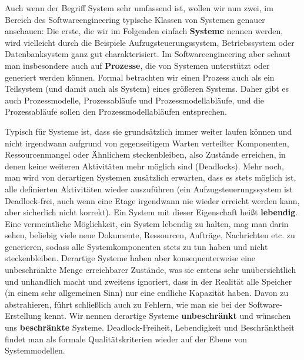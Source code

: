 \vspace{1mm} %

\label{text:prozesse_als_teilsysteme}
Auch wenn der Begriff System sehr umfassend ist, 
wollen wir nun zwei, im Bereich des Softwareengineering typische Klassen von Systemen genauer anschauen: Die erste, die wir im Folgenden einfach \textbf{Systeme} nennen werden, wird vielleicht durch die Beispiele Aufzugsteuerungssystem, Betriebssystem oder Datenbanksystem ganz gut charakterisiert. Im Softwareengineering aber schaut man insbesondere auch auf \textbf{Prozesse}, die von Systemen unterstützt oder generiert werden können. Formal betrachten wir einen Prozess auch als ein Teilsystem (und damit auch als System) eines größeren Systems. Daher gibt es auch Prozessmodelle, Prozessabläufe und Prozessmodellabläufe, und die Prozessabläufe sollen den Prozessmodellabläufen entsprechen.

\vspace{1mm} %

Typisch für Systeme ist, 
dass sie grundsätzlich immer weiter laufen können und nicht irgendwann aufgrund von gegenseitigem Warten verteilter Komponenten, Ressourcenmangel oder Ähnlichem steckenbleiben, also Zustände erreichen, in denen keine weiteren Aktivitäten mehr möglich sind (Deadlocks). Mehr noch, man wird von derartigen Systemen zusätzlich erwarten, dass es stets möglich ist, alle definierten Aktivitäten wieder auszuführen (ein Aufzugsteuerungssystem ist Deadlock-frei, auch wenn eine Etage irgendwann nie wieder erreicht werden kann, aber sicherlich nicht korrekt). Ein System mit dieser Eigenschaft heißt \textbf{lebendig}. Eine vermeint\-liche Möglichkeit, ein System lebendig zu halten, mag man darin sehen, beliebig viele neue Dokumente, Ressourcen, Aufträge, Nachrichten etc. zu generieren, sodass alle Systemkomponenten stets zu tun haben und nicht steckenbleiben. Derartige Systeme haben aber konsequenterweise eine unbeschränkte Menge erreichbarer Zustände, was sie erstens sehr unübersichtlich und unhandlich macht und zweitens ignoriert, dass in der Realität alle Speicher (in einem sehr allgemeinen Sinn) nur eine endliche Kapazität haben. Davon zu abstrahieren, führt schließlich auch zu Fehlern, wie man sie bei der Software-Erstellung kennt. Wir nennen derartige Systeme \textbf{unbeschränkt} und wünschen uns \textbf{beschränkte} Systeme. Deadlock-Freiheit, Lebendigkeit und Beschränktheit findet man als formale Qualitätskriterien wieder auf der Ebene von Systemmodellen.

